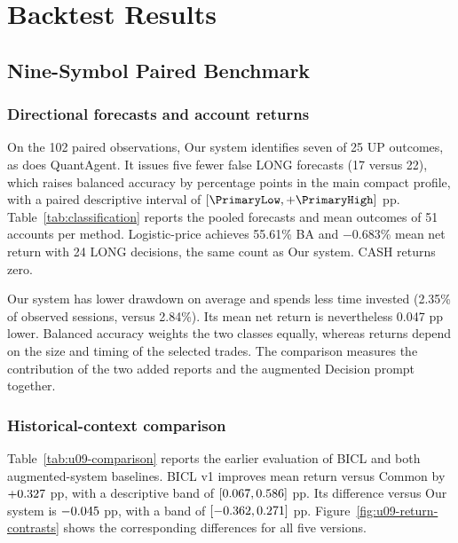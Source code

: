 \section{Backtest Results}
\label{sec:backtestresults}

\subsection{Nine-Symbol Paired Benchmark}
\subsubsection{Directional forecasts and account returns}
On the 102 paired observations, Our system identifies seven of 25 UP
outcomes, as does QuantAgent. It issues five fewer false LONG forecasts
(17 versus 22), which raises balanced accuracy by \DeltaBA{} percentage
points in the main compact profile, with a paired descriptive interval
of $[\PrimaryLow,+\PrimaryHigh]$ pp. Table~\ref{tab:classification}
reports the pooled forecasts and mean outcomes of 51 accounts per method.
Logistic-price achieves 55.61\% BA and $-0.683$\% mean net return with
24 LONG decisions, the same count as Our system. CASH returns zero.



Our system has lower drawdown on average and spends less time invested
(2.35\% of observed sessions, versus 2.84\%). Its mean net return is
nevertheless 0.047 pp lower. Balanced accuracy weights the two classes
equally, whereas returns depend on the size and timing of the selected
trades. The comparison measures the contribution of the two added reports
and the augmented Decision prompt together.

\subsubsection{Historical-context comparison}
Table~\ref{tab:u09-comparison} reports the earlier evaluation of BICL and
both augmented-system baselines. BICL v1 improves mean return versus
Common by $+0.327$ pp, with a descriptive band of
$[0.067,0.586]$ pp. Its
difference versus Our system is $-0.045$ pp, with
a band of $[-0.362,0.271]$ pp.
Figure~\ref{fig:u09-return-contrasts} shows the corresponding differences
for all five versions.



